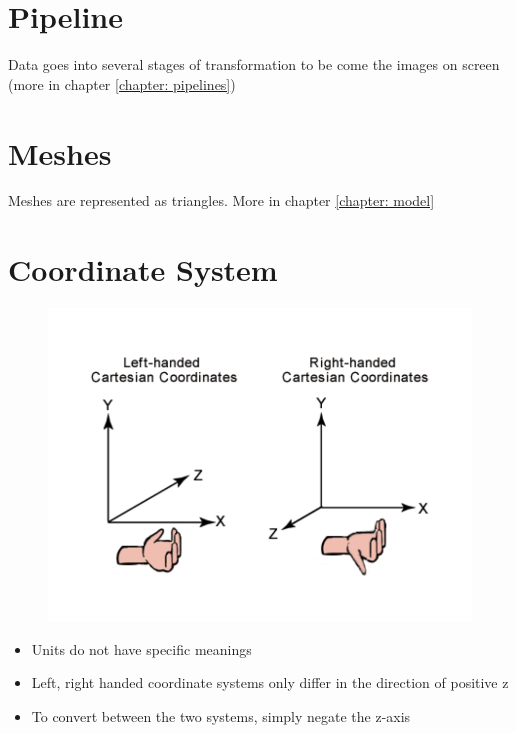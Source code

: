 \section{Pipeline}

  Data goes into several stages of transformation to be come the images on
  screen (more in chapter \ref{chapter: pipelines})

\section{Meshes}

  Meshes are represented as triangles. More in chapter \ref{chapter: model}

\section{Coordinate System}

  \begin{figure}[H]
    \centering
    \includegraphics[width=0.7\columnwidth]{images/overview/left-right-hand.png}
  \end{figure}

  \begin{itemize}
    \item Units do not have specific meanings
    \item Left, right handed coordinate systems only differ in the direction of
    positive z
    \item To convert between the two systems, simply negate the z-axis
  \end{itemize}
